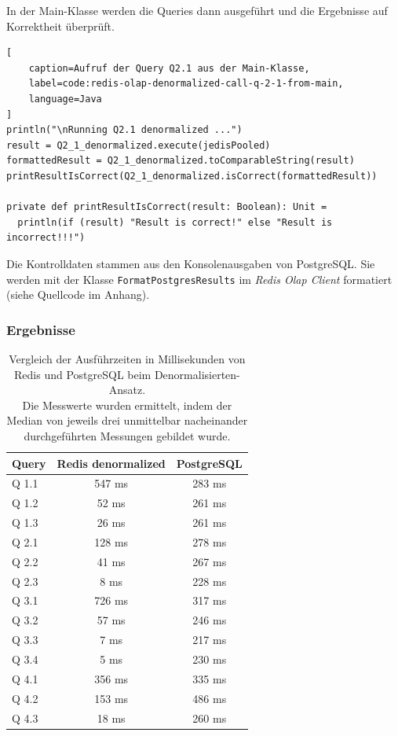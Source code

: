 In der Main-Klasse werden die Queries dann ausgeführt und die Ergebnisse auf Korrektheit überprüft.
\begin{lstlisting}[
    caption=Aufruf der Query Q2.1 aus der Main-Klasse,
    label=code:redis-olap-denormalized-call-q-2-1-from-main,
    language=Java
]
println("\nRunning Q2.1 denormalized ...")
result = Q2_1_denormalized.execute(jedisPooled)
formattedResult = Q2_1_denormalized.toComparableString(result)
printResultIsCorrect(Q2_1_denormalized.isCorrect(formattedResult))

private def printResultIsCorrect(result: Boolean): Unit = 
  println(if (result) "Result is correct!" else "Result is incorrect!!!")

\end{lstlisting}

Die Kontrolldaten stammen aus den Konsolenausgaben von PostgreSQL. Sie werden mit der Klasse \lstinline|FormatPostgresResults| im \emph{Redis Olap Client} formatiert (siehe Quellcode im Anhang).

\subsubsection{Ergebnisse}
\begin{table}[h]
\centering
\begin{tabular}{lcc}
\hline
Query & Redis denormalized & PostgreSQL \\ \hline
Q 1.1 & 547 ms  & 283 ms       \\
Q 1.2 & 52 ms   & 261 ms       \\
Q 1.3 & 26 ms   & 261 ms       \\
Q 2.1 & 128 ms  & 278 ms       \\
Q 2.2 & 41 ms   & 267 ms       \\
Q 2.3 & 8 ms    & 228 ms       \\
Q 3.1 & 726 ms  & 317 ms       \\
Q 3.2 & 57 ms   & 246 ms       \\
Q 3.3 & 7 ms    & 217 ms       \\
Q 3.4 & 5 ms    & 230 ms       \\
Q 4.1 & 356 ms  & 335 ms       \\
Q 4.2 & 153 ms  & 486 ms       \\
Q 4.3 & 18 ms   & 260 ms       \\ \hline
\end{tabular}
\caption{Vergleich der Ausführzeiten in Millisekunden von Redis und PostgreSQL beim Denormalisierten-Ansatz.\\
Die Messwerte wurden ermittelt, indem der Median von jeweils drei unmittelbar nacheinander durchgeführten Messungen gebildet wurde.}
\label{tab:results-denormalized}
\end{table}




